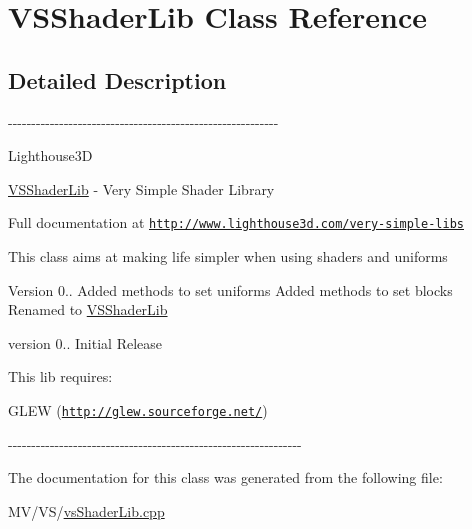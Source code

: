 \hypertarget{class_v_s_shader_lib}{\section{\-V\-S\-Shader\-Lib \-Class \-Reference}
\label{class_v_s_shader_lib}
}


\subsection{\-Detailed \-Description}
-\/-\/-\/-\/-\/-\/-\/-\/-\/-\/-\/-\/-\/-\/-\/-\/-\/-\/-\/-\/-\/-\/-\/-\/-\/-\/-\/-\/-\/-\/-\/-\/-\/-\/-\/-\/-\/-\/-\/-\/-\/-\/-\/-\/-\/-\/-\/-\/-\/-\/-\/-\/-\/-\/-\/-\/-\/-\/

\-Lighthouse3\-D

\hyperlink{class_v_s_shader_lib}{\-V\-S\-Shader\-Lib} -\/ \-Very \-Simple \-Shader \-Library

\-Full documentation at \href{http://www.lighthouse3d.com/very-simple-libs}{\tt http\-://www.\-lighthouse3d.\-com/very-\/simple-\/libs}

\-This class aims at making life simpler when using shaders and uniforms

\begin{DoxyVersion}{\-Version}
0.. \-Added methods to set uniforms \-Added methods to set blocks \-Renamed to \hyperlink{class_v_s_shader_lib}{\-V\-S\-Shader\-Lib}
\end{DoxyVersion}
version 0.. \-Initial \-Release

\-This lib requires\-:

\-G\-L\-E\-W (\href{http://glew.sourceforge.net/}{\tt http\-://glew.\-sourceforge.\-net/})

-\/-\/-\/-\/-\/-\/-\/-\/-\/-\/-\/-\/-\/-\/-\/-\/-\/-\/-\/-\/-\/-\/-\/-\/-\/-\/-\/-\/-\/-\/-\/-\/-\/-\/-\/-\/-\/-\/-\/-\/-\/-\/-\/-\/-\/-\/-\/-\/-\/-\/-\/-\/-\/-\/-\/-\/-\/-\/-\/-\/-\/-\/-\/ 

\-The documentation for this class was generated from the following file\-:\begin{DoxyCompactItemize}
\item 
\-M\-V/\-V\-S/\hyperlink{vs_shader_lib_8cpp}{vs\-Shader\-Lib.\-cpp}\end{DoxyCompactItemize}
